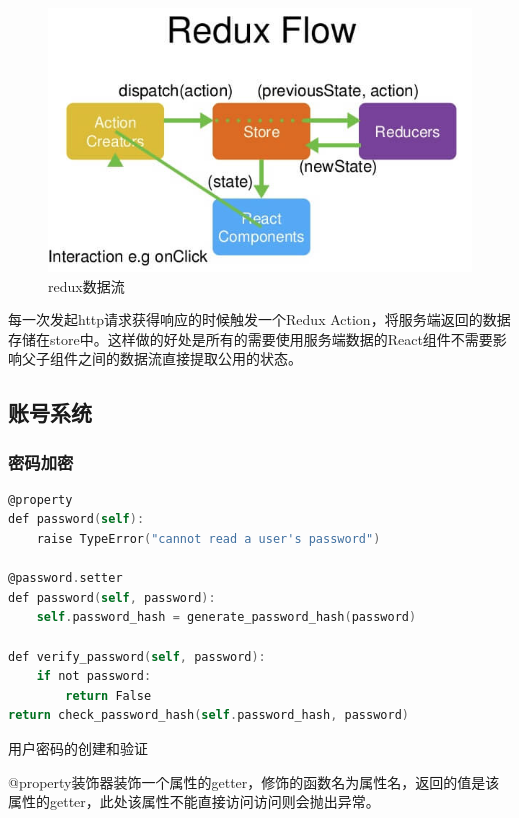 \begin{figure}[thbp!]
	\centering
	\includegraphics[width=1.0\linewidth]{figure/redux}
	\caption{redux数据流}
	\label{fig:redux}
\end{figure}

每一次发起http请求获得响应的时候触发一个Redux Action，将服务端返回的数据存储在store中。这样做的好处是所有的需要使用服务端数据的React组件不需要影响父子组件之间的数据流直接提取公用的状态。

\subsection{账号系统}

\subsubsection{密码加密}

\begin{lstlisting}[language=C]
@property
def password(self):
	raise TypeError("cannot read a user's password")

@password.setter
def password(self, password):
	self.password_hash = generate_password_hash(password)

def verify_password(self, password):
	if not password:
		return False
return check_password_hash(self.password_hash, password)
\end{lstlisting}

\begin{center}
	{\small 用户密码的创建和验证}
\end{center}

@property装饰器装饰一个属性的getter，修饰的函数名为属性名，返回的值是该属性的getter，此处该属性不能直接访问访问则会抛出异常。

